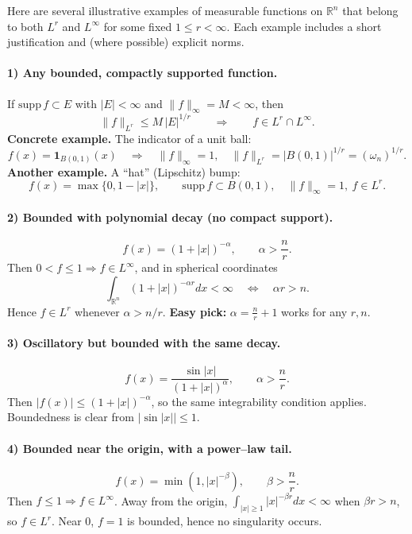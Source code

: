 \documentclass[12pt,a4paper]{article}
\theoremstyle{plain}
\theoremstyle{definition}
\theoremstyle{remark}
\theoremstyle{remark}
\theoremstyle{definition}
\begin{document}
Here are several illustrative examples of measurable functions on $\mathbb{R}^n$
that belong to both $L^r$ and $L^\infty$ for some fixed $1\le r<\infty$.
Each example includes a short justification and (where possible) explicit norms.

\bigskip
\paragraph{1) Any bounded, compactly supported function.}
If $\mathrm{supp}\,f\subset E$ with $|E|<\infty$ and $\|f\|_\infty=M<\infty$, then
\[
\|f\|_{L^r} \le M\,|E|^{1/r}
\qquad\Longrightarrow\qquad
f\in L^r\cap L^\infty.
\]
\textbf{Concrete example.} The indicator of a unit ball:
\[
f(x)=\mathbf{1}_{B(0,1)}(x)
\quad\Rightarrow\quad
\|f\|_\infty=1,\quad
\|f\|_{L^r}=|B(0,1)|^{1/r}=(\omega_n)^{1/r}.
\]
\textbf{Another example.} A ``hat'' (Lipschitz) bump:
\[
f(x)=\max\{0,1-|x|\},
\qquad
\mathrm{supp}\,f\subset B(0,1),\quad
\|f\|_\infty=1,\ f\in L^r.
\]

\bigskip
\paragraph{2) Bounded with polynomial decay (no compact support).}
\[
f(x)=(1+|x|)^{-\alpha},\qquad \alpha>\frac{n}{r}.
\]
Then $0<f\le1\Rightarrow f\in L^\infty$, and
in spherical coordinates
\[
\int_{\mathbb{R}^n}(1+|x|)^{-\alpha r}dx
<\infty \quad\Longleftrightarrow\quad
\alpha r>n.
\]
Hence $f\in L^r$ whenever $\alpha>n/r$.
\textbf{Easy pick:} $\alpha=\tfrac{n}{r}+1$ works for any $r,n$.

\bigskip
\paragraph{3) Oscillatory but bounded with the same decay.}
\[
f(x)=\frac{\sin|x|}{(1+|x|)^{\alpha}},\qquad \alpha>\frac{n}{r}.
\]
Then $|f(x)|\le (1+|x|)^{-\alpha}$, so the same integrability condition applies.
Boundedness is clear from $|\sin|x||\le1$.

\bigskip
\paragraph{4) Bounded near the origin, with a power--law tail.}
\[
f(x)=\min(1,|x|^{-\beta}),\qquad \beta>\frac{n}{r}.
\]
Then $f\le1\Rightarrow f\in L^\infty$.
Away from the origin, $\int_{|x|\ge1}|x|^{-\beta r}dx<\infty$ when $\beta r>n$, so $f\in L^r$.
Near $0$, $f=1$ is bounded, hence no singularity occurs.
\end{document}

